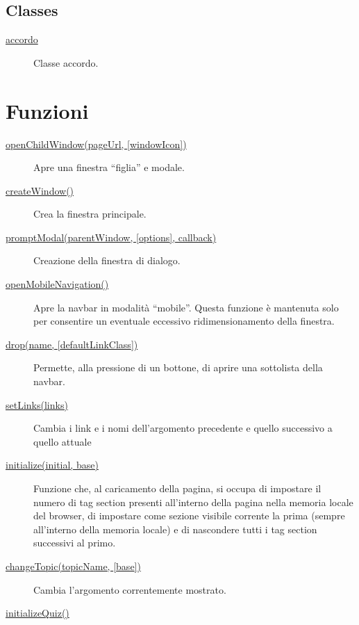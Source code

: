 \hypertarget{classes}{%
\subsection{Classes}\label{classes}}

\begin{description}
\item[{ \protect\hyperlink{accordo}{accordo} }]
Classe accordo.
\end{description}

\hypertarget{functions}{%
\section{Funzioni}\label{functions}}

\begin{description}
\item[{ \protect\hyperlink{openChildWindow}{openChildWindow(pageUrl,
{[}windowIcon{]})} }]
Apre una finestra ``figlia'' e modale.
\item[{ \protect\hyperlink{createWindow}{createWindow()} }]
Crea la finestra principale.
\item[{ \protect\hyperlink{promptModal}{promptModal(parentWindow,
{[}options{]}, callback)} }]
Creazione della finestra di dialogo.
\item[{ \protect\hyperlink{openMobileNavigation}{openMobileNavigation()}
}]
Apre la navbar in modalità ``mobile''. Questa funzione è mantenuta solo
per consentire un eventuale eccessivo ridimensionamento della finestra.
\item[{ \protect\hyperlink{drop}{drop(name, {[}defaultLinkClass{]})} }]
Permette, alla pressione di un bottone, di aprire una sottolista della
navbar.
\item[{ \protect\hyperlink{setLinks}{setLinks(links)} }]
Cambia i link e i nomi dell'argomento precedente e quello successivo a
quello attuale
\item[{ \protect\hyperlink{initialize}{initialize(initial, base)} }]
Funzione che, al caricamento della pagina, si occupa di impostare il
numero di tag section presenti all'interno della pagina nella memoria
locale del browser, di impostare come sezione visibile corrente la prima
(sempre all'interno della memoria locale) e di nascondere tutti i tag
section successivi al primo.
\item[{ \protect\hyperlink{changeTopic}{changeTopic(topicName,
{[}base{]})} }]
Cambia l'argomento correntemente mostrato.
\item[{ \protect\hyperlink{initializeQuiz}{initializeQuiz()} }]

\end{description}
